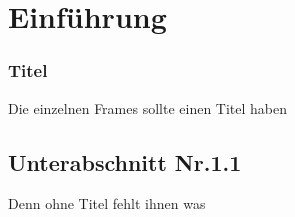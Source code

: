 \section{Einführung} 
\begin{frame}
\frametitle{Titel} 
Die einzelnen Frames sollte einen Titel haben 
\end{frame}
\subsection{Unterabschnitt Nr.1.1  }
\begin{frame} 
Denn ohne Titel fehlt ihnen was
\end{frame}